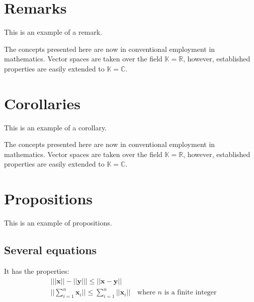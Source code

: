 \documentclass[11pt,fleqn]{book} %
\begin{document}

\section{Remarks}

This is an example of a remark.

\begin{remark}
The concepts presented here are now in conventional employment in mathematics. Vector spaces are taken over the field $\mathbb{K}=\mathbb{R}$, however, established properties are easily extended to $\mathbb{K}=\mathbb{C}$.
\end{remark}


\section{Corollaries}

This is an example of a corollary.

\begin{corollary}
The concepts presented here are now in conventional employment in mathematics. Vector spaces are taken over the field $\mathbb{K}=\mathbb{R}$, however, established properties are easily extended to $\mathbb{K}=\mathbb{C}$.
\end{corollary}


\section{Propositions}

This is an example of propositions.

\subsection{Several equations}

\begin{proposition}
It has the properties:
\begin{align}
& \big| ||\mathbf{x}|| - ||\mathbf{y}|| \big|\leq || \mathbf{x}- \mathbf{y}||\\
&  ||\sum_{i=1}^n\mathbf{x}_i||\leq \sum_{i=1}^n||\mathbf{x}_i||\quad\text{where $n$ is a finite integer}
\end{align}
\end{proposition}
\end{document}
